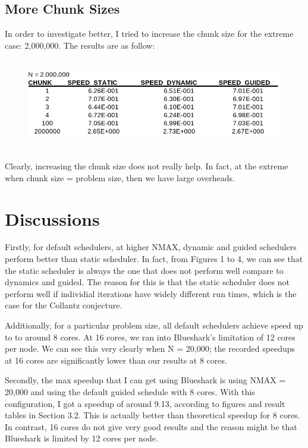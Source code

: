 \documentclass[12pt]{article}
\begin{document}
        \subsection{More Chunk Sizes}
        In order to investigate better, I tried to increase the chunk size for the extreme case: 2,000,000.  The results are as follow:

        \begin{figure}[H]
            \hfill\includegraphics[width=150mm,height= 40mm]{chunkMAX.png}\hspace*{\fill}
        \end{figure}
        \noindent
        Clearly, increasing the chunk size does not really help. In fact, at the extreme when chunk size = problem size, then we have large overheads. 

        \newpage
        \section{Discussions}
        Firstly, for default schedulers, at higher NMAX, dynamic and guided schedulers perform better than static scheduler. In fact, from Figures 1 to 4, we can see that the static scheduler is always the one that does not perform well compare to dynamics and guided.  The reason for this is that the static scheduler does not perform well if individial iterations have widely different run times, which is the case for the Collantz conjecture. \newline

        \noindent
        Additionally, for a particular problem size, all default schedulers achieve speed up to to around 8 cores. At 16 cores, we ran into Blueshark's limitation of 12 cores per node.  We can see this very clearly when N = 20,000; the recorded speedups at 16 cores are significantly lower than our results at 8 cores. 

        \noindent
        Secondly, the max speedup that I can get using Blueshark is using NMAX = 20,000 and using the default guided schedule with 8 cores.  With this configuration, I got a speedup of around 9.13, according to figures and result tables in Section 3.2. This is actually better than theoretical speedup for 8 cores. In contrast, 16 cores do not give very good results and the reason might be that Blueshark is limited by 12 cores per node.  \newline
\end{document}
